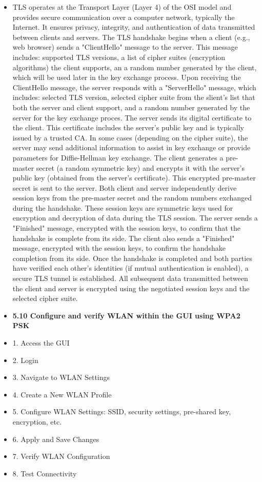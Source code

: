 \documentclass{article}
\begin{document}
\begin{itemize}
  	\item[] TLS operates at the Transport Layer (Layer 4) of the OSI model and provides secure communication over a computer network, typically the Internet. It ensures privacy, integrity, and authentication of data transmitted between clients and servers. The TLS handshake begins when a client (e.g., web browser) sends a "ClientHello" message to the server. This message includes: supported TLS versions, a list of cipher suites (encryption algorithms) the client supports, an a random number generated by the client, which will be used later in the key exchange process. Upon receiving the ClientHello message, the server responds with a "ServerHello" message, which includes: selected TLS version, selected cipher suite from the slient's list that both the server and client support, and a random number generated by the server for the key exchange proces. The server sends its digital certificate to the client. This certificate includes the server's public key and is typically issued by a trusted CA. In some cases (depending on the cipher suite), the server may send additional information to assist in key exchange or provide parameters for Diffie-Hellman key exchange. The client generates a pre-master secret (a random symmetric key) and encrypts it with the server's public key (obtained from the server's certificate). This encrypted pre-master secret is sent to the server. Both client and server independently derive session keys from the pre-master secret and the random numbers exchanged during the handshake. These session keys are symmetric keys used for encryption and decryption of data during the TLS session. The server sends a "Finished" message, encrypted with the session keys, to confirm that the handshake is complete from its side. The client also sends a "Finished" message, encrypted with the session keys, to confirm the handshake completion from its side. Once the handshake is completed and both parties have verified each other's identities (if mutual authentication is enabled), a secure TLS tunnel is established. All subsequent data transmitted between the client and server is encrypted using the negotiated session keys and the selected cipher suite.
  
  \item \textbf{5.10 Configure and verify WLAN within the GUI using WPA2 PSK}
	\item[] 1. Access the GUI
	\item[] 2. Login
	\item[] 3. Navigate to WLAN Settings
	\item[] 4. Create a New WLAN Profile
	\item[] 5. Configure WLAN Settings: SSID, security settings, pre-shared key, encryption, etc.
	\item[] 6. Apply and Save Changes
	\item[] 7. Verify WLAN Configuration
	\item[] 8. Test Connectivity

\end{itemize}
\end{document}
